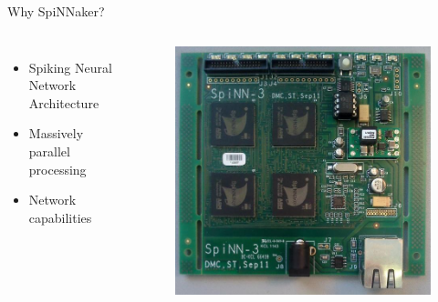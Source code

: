 \documentclass[17pt,mathserif]{beamer}
\begin{document}
    \begin{frame}{Why SpiNNaker?} %
        \vspace*{-3em}        
        \begin{columns}[c] %
            \begin{itemize}
                \item Spiking Neural Network Architecture 
                \item Massively parallel processing
                \item Network capabilities
            \end{itemize}
            \begin{figure}
                \includegraphics[width=\textwidth]{spin3}
            \end{figure}
        \end{columns}
    \end{frame}
    
\end{document}
